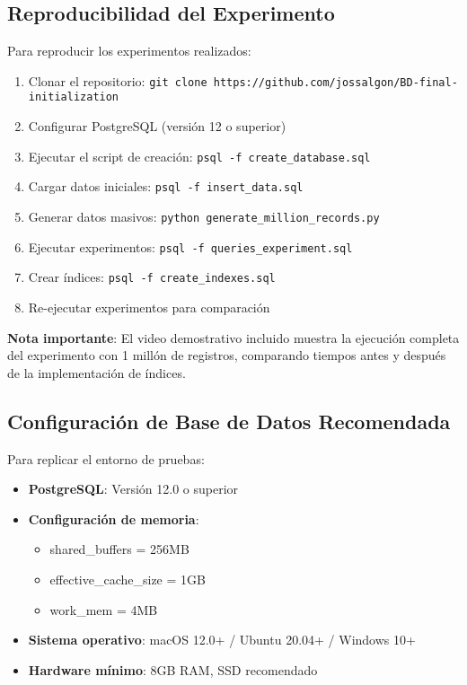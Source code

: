 \documentclass[12pt,a4paper]{article}
\begin{document}
\subsection{Reproducibilidad del Experimento}

Para reproducir los experimentos realizados:

\begin{enumerate}
    \item Clonar el repositorio: \texttt{git clone https://github.com/jossalgon/BD-final-initialization}
    \item Configurar PostgreSQL (versión 12 o superior)
    \item Ejecutar el script de creación: \texttt{psql -f create\_database.sql}
    \item Cargar datos iniciales: \texttt{psql -f insert\_data.sql}
    \item Generar datos masivos: \texttt{python generate\_million\_records.py}
    \item Ejecutar experimentos: \texttt{psql -f queries\_experiment.sql}
    \item Crear índices: \texttt{psql -f create\_indexes.sql}
    \item Re-ejecutar experimentos para comparación
\end{enumerate}

\textbf{Nota importante}: El video demostrativo incluido muestra la ejecución completa del experimento con 1 millón de registros, comparando tiempos antes y después de la implementación de índices.

\subsection{Configuración de Base de Datos Recomendada}

Para replicar el entorno de pruebas:

\begin{itemize}
    \item \textbf{PostgreSQL}: Versión 12.0 o superior
    \item \textbf{Configuración de memoria}: 
        \begin{itemize}
            \item shared\_buffers = 256MB
            \item effective\_cache\_size = 1GB
            \item work\_mem = 4MB
        \end{itemize}
    \item \textbf{Sistema operativo}: macOS 12.0+ / Ubuntu 20.04+ / Windows 10+
    \item \textbf{Hardware mínimo}: 8GB RAM, SSD recomendado
\end{itemize}
\end{document}
